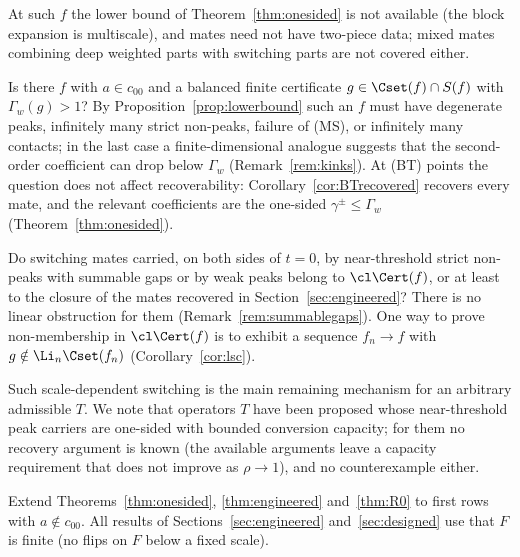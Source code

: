 At such $f$ the lower bound of Theorem~\ref{thm:onesided} is not available
(the block expansion is multiscale), and mates need not have two-piece data;
mixed mates combining deep weighted parts with switching parts are not
covered either.

\begin{problem}\label{prob:secondorder}
Is there $f$ with $a\in c_{00}$ and a balanced finite certificate
$g\in\Cset(f)\cap S(f)$ with $\Gamma_w(g)>1$?  By
Proposition~\ref{prop:lowerbound} such an $f$ must have degenerate peaks,
infinitely many strict non-peaks, failure of (MS), or infinitely many
contacts; in the last case a finite-dimensional analogue suggests that the
second-order coefficient can drop below $\Gamma_w$ (Remark~\ref{rem:kinks}).
At \textup{(BT)} points the question does not affect recoverability:
Corollary~\ref{cor:BTrecovered} recovers every mate, and the relevant
coefficients are the one-sided $\gamma^\pm\le\Gamma_w$
(Theorem~\ref{thm:onesided}).
\end{problem}

\begin{problem}\label{prob:approx}
Do switching mates carried, on both sides of $t=0$, by near-threshold
strict non-peaks with summable gaps or by weak peaks belong to
$\cl\Cert(f)$, or at least to the closure of the mates recovered in
Section~\ref{sec:engineered}?  There is no linear obstruction for them
(Remark~\ref{rem:summablegaps}).  One way to prove non-membership in
$\cl\Cert(f)$ is to exhibit a sequence $f_n\to f$ with
$g\notin\Li_n\Cset(f_n)$ (Corollary~\ref{cor:lsc}).
\end{problem}

Such scale-dependent switching is the main remaining mechanism for an
arbitrary admissible $T$.  We note that operators $T$ have been proposed whose
near-threshold peak carriers are one-sided with bounded conversion capacity;
for them no recovery argument is known (the available arguments leave a
capacity requirement that does not improve as $\rho\to1$), and no
counterexample either.

\begin{problem}\label{prob:infiniteF}
Extend Theorems~\ref{thm:onesided}, \ref{thm:engineered} and~\ref{thm:R0}
to first rows with $a\notin c_{00}$.  All results of
Sections~\ref{sec:engineered} and~\ref{sec:designed} use that $F$ is finite
(no flips on $F$ below a fixed scale).
\end{problem}

